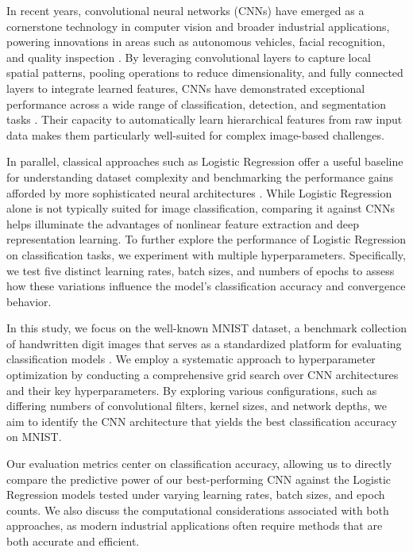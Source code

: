 In recent years, convolutional neural networks (CNNs) have emerged as a cornerstone technology in computer vision and broader industrial applications, powering innovations in areas such as autonomous vehicles, facial recognition, and quality inspection \cite{lecun2015deep, krizhevsky2012imagenet}. By leveraging convolutional layers to capture local spatial patterns, pooling operations to reduce dimensionality, and fully connected layers to integrate learned features, CNNs have demonstrated exceptional performance across a wide range of classification, detection, and segmentation tasks \cite{he2016deep}. Their capacity to automatically learn hierarchical features from raw input data makes them particularly well-suited for complex image-based challenges.

In parallel, classical approaches such as Logistic Regression offer a useful baseline for understanding dataset complexity and benchmarking the performance gains afforded by more sophisticated neural architectures \cite{hastie2009elements}. While Logistic Regression alone is not typically suited for image classification, comparing it against CNNs helps illuminate the advantages of nonlinear feature extraction and deep representation learning. To further explore the performance of Logistic Regression on classification tasks, we experiment with multiple hyperparameters. Specifically, we test five distinct learning rates, batch sizes, and numbers of epochs to assess how these variations influence the model's classification accuracy and convergence behavior.

In this study, we focus on the well-known MNIST dataset, a benchmark collection of handwritten digit images that serves as a standardized platform for evaluating classification models \cite{lecun1998gradient}. We employ a systematic approach to hyperparameter optimization by conducting a comprehensive grid search over CNN architectures and their key hyperparameters. By exploring various configurations, such as differing numbers of convolutional filters, kernel sizes, and network depths, we aim to identify the CNN architecture that yields the best classification accuracy on MNIST.

Our evaluation metrics center on classification accuracy, allowing us to directly compare the predictive power of our best-performing CNN against the Logistic Regression models tested under varying learning rates, batch sizes, and epoch counts. We also discuss the computational considerations associated with both approaches, as modern industrial applications often require methods that are both accurate and efficient.

